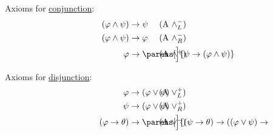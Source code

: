 \begin{definition}
\begin{thmenum}[series=def:minimal_propositional_axiomatic_deductive_system]
     Axioms for \hyperref[def:propositional_language/connectives/conjunction]{conjunction}:
    \begin{align}
      \mathllap{ (\varphi \wedge \psi) } &\rightarrow \mathrlap{ \psi } \tag{\textrm{A} \( \wedge_L^- \)} \label{eq:def:minimal_propositional_axiomatic_deductive_system/and/elim_left} \\
      \mathllap{ (\varphi \wedge \psi) } &\rightarrow \mathrlap{ \varphi } \tag{\textrm{A} \( \wedge_R^- \)} \label{eq:def:minimal_propositional_axiomatic_deductive_system/and/elim_right} \\
      \mathllap{ \varphi }               &\rightarrow \mathrlap{ \parens[\Big]{ \psi \rightarrow (\varphi \wedge \psi) } } \tag{\textrm{A} \( \wedge^+ \)} \label{eq:def:minimal_propositional_axiomatic_deductive_system/and/intro}
    \end{align}

     Axioms for \hyperref[def:propositional_language/connectives/disjunction]{disjunction}:
    \begin{align}
      \mathllap{ \varphi }                      &\rightarrow \mathrlap{ (\varphi \vee \psi) } \tag{\textrm{A} \( \vee_L^+ \)} \label{eq:def:minimal_propositional_axiomatic_deductive_system/or/intro_left} \\
      \mathllap{ \psi }                      &\rightarrow \mathrlap{ (\varphi \vee \psi) } \tag{\textrm{A} \( \vee_R^+ \)} \label{eq:def:minimal_propositional_axiomatic_deductive_system/or/intro_right} \\
      \mathllap{ (\varphi \rightarrow \theta) } &\rightarrow \mathrlap{ \parens[\Big]{ (\psi \rightarrow \theta) \rightarrow ((\varphi \vee \psi) \rightarrow \theta) } } \tag{\textrm{A} \( \vee^- \)} \label{eq:def:minimal_propositional_axiomatic_deductive_system/or/elim}
    \end{align}
  \end{thmenum}


\end{definition}
